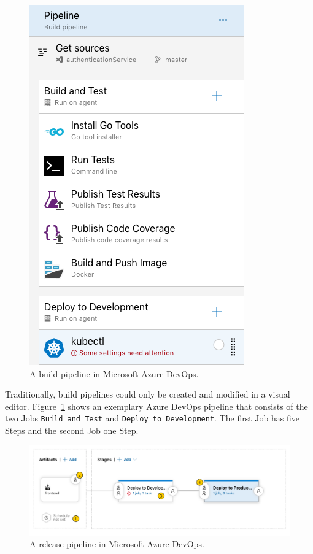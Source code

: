 \begin{figure}[H]
\begin{center}
  \includegraphics[scale=0.6]{images/figures/azure_devops_build_pipeline.png}
\end{center}
\caption{A build pipeline in Microsoft Azure DevOps.}%
\label{fig:build_pipeline_azure}
\end{figure}

Traditionally, build pipelines could only be created and modified in a visual
editor. Figure~\ref{fig:build_pipeline_azure} shows an exemplary Azure DevOps
pipeline that consists of the two Jobs \texttt{Build and Test} and
\texttt{Deploy to Development}. The first Job has five Steps and the second Job
one Step.

\begin{figure}[H]
\begin{center}
  \includegraphics[scale=0.7]{images/figures/azure_devops_release_pipeline_base.pdf}
\end{center}
\caption{A release pipeline in Microsoft Azure DevOps.}%
\label{fig:release_pipeline_azure}
\end{figure}

